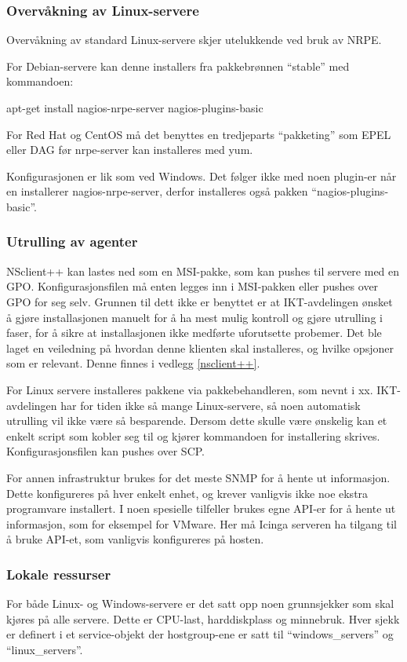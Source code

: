 \subsubsection{Overvåkning av Linux-servere}
Overvåkning av standard Linux-servere skjer utelukkende ved bruk av NRPE. 

For Debian-servere kan denne installers fra pakkebrønnen “stable” med kommandoen:

apt-get install nagios-nrpe-server nagios-plugins-basic

For Red Hat og CentOS må det benyttes en tredjeparts “pakketing” som EPEL eller DAG før nrpe-server kan installeres med yum.

Konfigurasjonen er lik som ved Windows. Det følger ikke med noen plugin-er når en installerer nagios-nrpe-server, derfor installeres også pakken “nagios-plugins-basic”.

\subsubsection{Utrulling av agenter}
NSclient++ kan lastes ned som en MSI-pakke, som kan pushes til servere med en GPO. Konfigurasjonsfilen må enten legges inn i MSI-pakken eller pushes over GPO for seg selv. Grunnen til dett ikke er benyttet er at IKT-avdelingen ønsket å gjøre installasjonen manuelt for å ha mest mulig kontroll og gjøre utrulling i faser, for å sikre at installasjonen ikke medførte uforutsette probemer. Det ble laget en veiledning på hvordan denne klienten skal installeres, og hvilke opsjoner som er relevant. Denne finnes i vedlegg \ref{nsclient++}.

For Linux servere installeres pakkene via pakkebehandleren, som nevnt i xx. IKT-avdelingen har for tiden ikke så mange Linux-servere, så noen automatisk utrulling vil ikke være så besparende. Dersom dette skulle være ønskelig kan et enkelt script som kobler seg til og kjører kommandoen for installering skrives. Konfigurasjonsfilen kan pushes over SCP.

For annen infrastruktur brukes for det meste SNMP for å hente ut informasjon. Dette konfigureres på hver enkelt enhet, og krever vanligvis ikke noe ekstra programvare installert. I noen spesielle tilfeller brukes egne API-er for å hente ut informasjon, som for eksempel for VMware. Her må Icinga serveren ha tilgang til å bruke API-et, som vanligvis konfigureres på hosten.

\subsubsection{Lokale ressurser}
For både Linux- og Windows-servere er det satt opp noen grunnsjekker som skal kjøres på alle servere. Dette er CPU-last, harddiskplass og minnebruk. Hver sjekk er definert i et service-objekt der hostgroup-ene er satt til “windows\_servers” og “linux\_servers”. 

